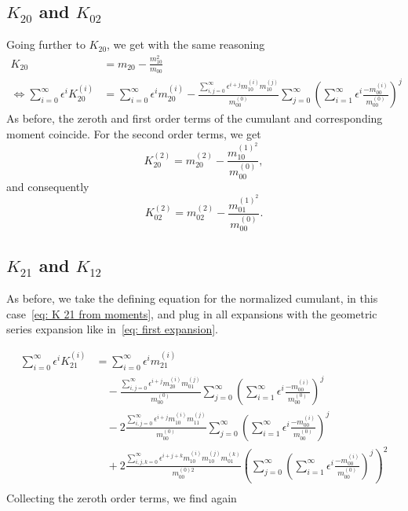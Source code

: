 
\subsection{\texorpdfstring{$K_{20}$}{K 20} and \texorpdfstring{$K_{02}$}{K 02}}
\label{sub: K 20}
Going further to $K_{20}$, we get with the same reasoning
\begin{equation}
  \begin{aligned}
    K_{20} & = m_{20} - \frac{m_{10}^2}{m_{00}}\\
    \Leftrightarrow
    \sum_{i=0}^\infty \epsilon^i K_{20}^{(i)}
    & = \sum_{i=0}^\infty \epsilon^i m_{20}^{(i)} -
    \frac{\sum_{i,j=0}^\infty \epsilon^{i+j} m_{10}^{(i)}m_{10}^{(j)}}
        {m_{00}^{(0)}}
    \sum_{j=0}^\infty {\left(\sum_{i=1}^\infty \epsilon^i \frac{ - m_{00}^{(i)}}{ m_{00}^{(0)}}\right)}^j
  \end{aligned}
\end{equation}
As before, the zeroth and first order terms of the cumulant and corresponding moment coincide.
For the second order terms, we get
\begin{equation}
  K_{20}^{(2)} = m_{20}^{(2)}
  - \frac{ m_{10}^{{(1)}^2}}{m_{00}^{(0)}},
\end{equation}
and consequently
\begin{equation}
  K_{02}^{(2)} = m_{02}^{(2)}
  - \frac{ m_{01}^{{(1)}^2}}{m_{00}^{(0)}}.
\end{equation}

\subsection{\texorpdfstring{$K_{21}$}{K 21} and \texorpdfstring{$K_{12}$}{K 12}}
\label{sub: K 21}
As before, we take the defining equation for the normalized cumulant, in this case~\eqref{eq: K 21 from moments}, and plug in all expansions with the geometric series expansion like in~\eqref{eq: first expansion}.

\begin{equation}
  \begin{aligned}
    \sum_{i=0}^\infty \epsilon^i K_{21}^{(i)}
    & = \sum_{i=0}^\infty \epsilon^i m_{21}^{(i)}
    \\ &\quad
    - \frac{\sum_{i,j=0}^\infty \epsilon^{i+j} m_{20}^{(i)} m_{01}^{(j)}}{m_{00}^{(0)}}
      \sum_{j=0}^\infty {\left(\sum_{i=1}^\infty \epsilon^i \frac{ - m_{00}^{(i)}}{ m_{00}^{(0)}}\right)}^j
    \\ &\quad
     - 2\frac{\sum_{i,j=0}^\infty \epsilon^{i+j} m_{10}^{(i)} m_{11}^{(j)}}{m_{00}^{(0)}}
      \sum_{j=0}^\infty {\left(\sum_{i=1}^\infty \epsilon^i \frac{ - m_{00}^{(i)}}{ m_{00}^{(0)}}\right)}^j
     \\ &\quad
     + 2\frac{\sum_{i,j,k=0}^\infty \epsilon^{i+j+k} m_{10}^{(i)} m_{10}^{(j)} m_{01}^{(k)}}{m_{00}^{(0)2}}
      {\left(
        \sum_{j=0}^\infty {\left(\sum_{i=1}^\infty \epsilon^i \frac{ - m_{00}^{(i)}}{ m_{00}^{(0)}}\right)}^j
      \right)}^2\\
   \end{aligned}
\end{equation}
Collecting the zeroth order terms, we find again

